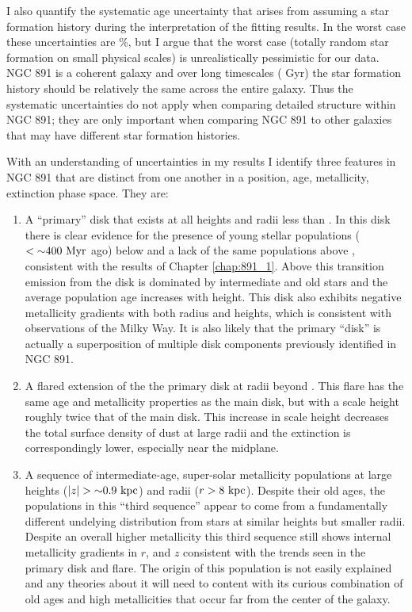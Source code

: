 I also quantify the systematic age uncertainty that arises from
assuming a star formation history during the interpretation of the
fitting results. In the worst case these uncertainties are \%,
but I argue that the worst case (totally random star formation on
small physical scales) is unrealistically pessimistic for our
data. NGC 891 is a coherent galaxy and over long timescales (\asim
Gyr) the star formation history should be relatively the same across
the entire galaxy. Thus the systematic uncertainties do not apply when
comparing detailed structure within NGC 891; they are only important
when comparing NGC 891 to other galaxies that may have different star
formation histories.

With an understanding of uncertainties in my results I identify three
features in NGC 891 that are distinct from one another in a position,
age, metallicity, extinction phase space. They are:
\begin{enumerate}

\item A ``primary'' disk that exists at all heights and radii less
  than . In this disk there is clear evidence for the
  presence of young stellar populations ($< {\sim} 400~\mathrm{Myr} $ ago)
  below  and a lack of the same populations above
  , consistent with the results of Chapter
  \ref{chap:891_1}. Above this transition emission from the disk is
  dominated by intermediate and old stars and the average population
  age increases with height. This disk also exhibits negative
  metallicity gradients with both radius and heights, which is
  consistent with observations of the Milky Way. It is also likely
  that the primary ``disk'' is actually a superposition of multiple
  disk components previously identified in NGC 891.

\item A flared extension of the the primary disk at radii beyond
  . This flare has the same age and metallicity properties
  as the main disk, but with a scale height roughly twice that of the
  main disk. This increase in scale height decreases the total surface
  density of dust at large radii and the extinction is correspondingly
  lower, especially near the midplane.
  
\item A sequence of intermediate-age, super-solar metallicity
  populations at large heights ($|z|> \val{\asim 0.9}{kpc}$) and radii
  ($r>8~\mathrm{kpc} $). Despite their old ages, the populations in this
  ``third sequence'' appear to come from a fundamentally different
  undelying distribution from stars at similar heights but smaller
  radii. Despite an overall higher metallicity this third sequence
  still shows internal metallicity gradients in $r$, and $z$
  consistent with the trends seen in the primary disk and flare. The
  origin of this population is not easily explained and any theories
  about it will need to content with its curious combination of old
  ages and high metallicities that occur far from the center of the
  galaxy.

\end{enumerate}


